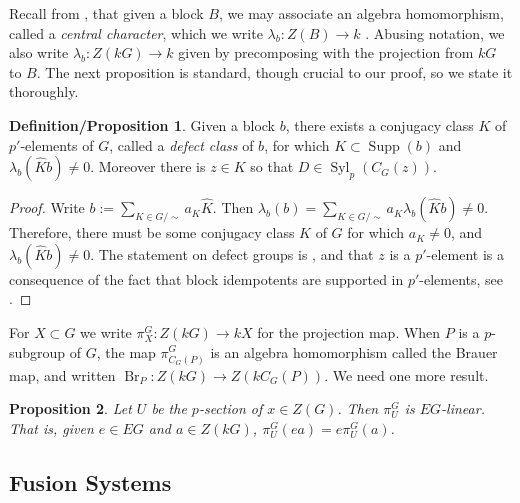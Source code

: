 \documentclass{amsart}
\theoremstyle{plain}\newtheorem{theorem}{Theorem}[section]
\theoremstyle{plain}\newtheorem{conjecture}[theorem]{Conjecture}
\theoremstyle{plain}\newtheorem{corollary}[theorem]{Corollary}
\theoremstyle{plain}\newtheorem{lemma}[theorem]{Lemma}
\theoremstyle{plain}\newtheorem{proposition}[theorem]{Proposition}
\theoremstyle{plain}\newtheorem{statement}[theorem]{}
\theoremstyle{definition}\newtheorem{definition}[theorem]{Definition}
\theoremstyle{definition}\newtheorem{example}[theorem]{Example}
\theoremstyle{definition}\newtheorem{examples}[theorem]{Examples}
\theoremstyle{definition}\newtheorem{notation}[theorem]{Notation}
\theoremstyle{definition}\newtheorem{remark}[theorem]{Remark}
\theoremstyle{definition}\newtheorem{remarks}[theorem]{Remarks}
\theoremstyle{definition}\newtheorem{question}[theorem]{Question}
\theoremstyle{definition}\newtheorem{propositiondefinition}[theorem]{Definition/Proposition}
\DeclareMathOperator{\Br}{Br}
\begin{document}
Recall from \cite[Chapter 2]{navarro}, that given a block $B$, we may associate an algebra homomorphism, called a \emph{central character}, which we write $\lambda_b: Z(B) \rightarrow k$ . Abusing notation, we also write $\lambda_b:Z(kG) \rightarrow k$ given by precomposing with the projection from $kG$ to $B$. The next proposition is standard, though crucial to our proof, so we state it thoroughly.

\begin{propositiondefinition}\label{def:defectclass}
Given a block $b$, there exists a conjugacy class $K$ of $p'$-elements of $G$, called a \emph{defect class} of $b$, for which $K \subset \operatorname{Supp}(b)$ and $\lambda_b(\hat{K}  b) \not=0$. Moreover there is $z \in K$ so that $D \in \operatorname{Syl}_p(C_G(z))$.
\end{propositiondefinition}
\begin{proof}
Write $b := \sum_{K \in G/ \sim} a_K \hat{K}$. Then $\lambda_b(b) = \sum_{K \in G/\sim} a_K \lambda_b(\hat{K}b)\not=0$. Therefore, there must be some conjugacy class $K$ of $G$ for which $a_K\not=0$, and $\lambda_b(\hat{K}b) \not=0$. The statement on defect groups is \cite[Corollary 4.5]{navarro}, and that $z$ is a $p'$-element is a consequence of the fact that block idempotents are supported in $p'$-elements, see \cite[(61)]{kulshammer}.
\end{proof}

For $X \subset G$ we write $\pi_X^G:Z(kG)\rightarrow kX$ for the projection map. When $P$ is a $p$-subgroup of $G$, the map $\pi_{C_G(P)}^G$ is an algebra homomorphism called the Brauer map, and written $\Br_P:Z(kG) \rightarrow Z(kC_G(P))$. We need one more result.
\begin{proposition}\cite[(61)]{kulshammer}\label{kulshammerproj} Let $U$ be the $p$-section of $x \in Z(G)$. Then $\pi_U^G$ is $EG$-linear. That is, given $e \in EG$ and $a \in Z(kG)$, $\pi_U^G(ea) = e\pi_U^G(a)$.
\end{proposition}


\subsection{Fusion Systems}
\end{document}
